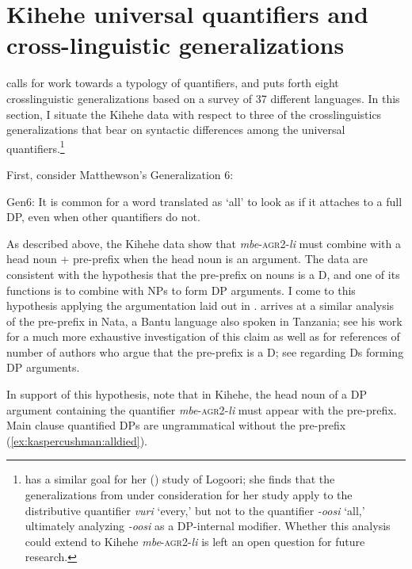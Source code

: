 \documentclass[output=paper,modfonts,nonflat]{langsci/langscibook}
\begin{document}
 

\section{Kihehe universal quantifiers and cross-linguistic generalizations}\label{sec:kaspercushman:5}  \label{ex:kaspercushman:type}
\citet{Matthewson2013} calls for work towards a typology of quantifiers, and puts forth eight crosslinguistic generalizations based on a survey of 37 different languages. In this section, I situate the Kihehe data with respect to three of the crosslinguistics generalizations that bear on syntactic differences among the universal quantifiers.\footnote{\citeauthor{Landman2016} has a similar goal for her (\citeyear{Landman2016}) study of Logoori; she finds that the generalizations from \cite{Matthewson2013} under consideration for her study apply to the distributive quantifier \textit{vuri} `every,' but not to the quantifier \textit{-oosi} `all,' ultimately analyzing \textit{-oosi} as a DP-internal modifier. Whether this analysis could extend to Kihehe \textit{mbe}-\textsc{agr2}-\textit{li} is left an open question for future research.}  



First, consider Matthewson's Generalization 6:

\begin{exe}
\ex Gen6: It is common for a word translated as `all' to look as if it attaches to a full DP, even when other quantifiers do not. \citep[35]{Matthewson2013}
\end{exe}

As described above, the Kihehe data show that \textit{mbe}-\textsc{agr2}-\textit{li} must combine with a head noun + pre-prefix when the head noun is an argument. The data are consistent with the hypothesis that the pre-prefix on nouns is a D, and one of its functions is to combine with NPs to form DP arguments. I come to this hypothesis applying the argumentation laid out in \cite{Matthewson2001}. \cite{gambarage16} arrives at a similar analysis of the pre-prefix in Nata, a Bantu language also spoken in Tanzania; see his work for a much more exhaustive investigation of this claim as well as for references of number of authors who argue that the pre-prefix is a D; see \cite{longobardi94} regarding Ds forming DP arguments.

In support of this hypothesis, note that in Kihehe, the head noun of a DP argument containing the quantifier \textit{mbe}-\textsc{agr2}-\textit{li} must appear with the pre-prefix. Main clause quantified DPs are ungrammatical without the pre-prefix (\ref{ex:kaspercushman:alldied}).
\end{document}
